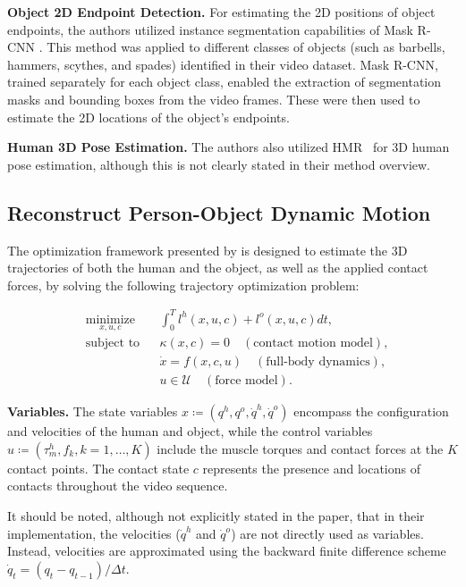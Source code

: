 \noindent\textbf{Object 2D Endpoint Detection.} For estimating the 2D positions of object endpoints, the authors utilized instance segmentation 
capabilities of Mask R-CNN \cite{he2017mask}. This method was applied to different classes of objects (such as barbells, hammers, scythes, 
and spades) identified in their video dataset. Mask R-CNN, trained separately for each object class, enabled the extraction of segmentation masks
and bounding boxes from the video frames. These were then used to estimate the 2D locations of the object's endpoints.

\noindent\textbf{Human 3D Pose Estimation.} The authors also utilized HMR~\cite{kanazawa2018end} for 3D human pose estimation, although this 
is not clearly stated in their method overview.


\subsection{Reconstruct Person-Object Dynamic Motion}
\label{subsec:reconstruct_original}

The optimization framework presented by \citet{li2019estimating} is designed to estimate the 3D trajectories of both the human and the object, 
as well as the applied contact forces, by solving the following trajectory optimization problem: 

\begin{equation*}
    \begin{aligned}
        & \underset{x,u,c}{\text{minimize}}
        & & \int_{0}^{T} l^h(x, u, c) + l^o(x, u, c)dt, \\
        & \text{subject to}
        & & \kappa(x, c) = 0 \quad (\text{contact motion model}), \\
        &&& \dot{x} = f (x, c, u) \quad (\text{full-body dynamics}), \\
        &&& u \in \mathcal{U} \quad (\text{force model}).
    \end{aligned}
\end{equation*}

\noindent\textbf{Variables.} The state variables \(x \coloneqq (q^h, q^o, \dot{q}^h, \dot{q}^o)\) encompass the configuration and velocities of 
the human and object, while the control variables \(u \coloneqq (\tau_m^h, f_k, k=1, \dots, K)\) include the muscle torques and contact forces 
at the \(K\) contact points. The contact state \(c\) represents the presence and locations of contacts throughout the video sequence. 

It should be noted, although not explicitly stated in the paper, that in their implementation, the velocities (\(\dot{q}^h\) and \(\dot{q}^o\))
are not directly used as variables. Instead, velocities are approximated using the backward finite difference scheme 
\(\dot{q}_t = (q_t - q_{t - 1}) / \Delta t\).

